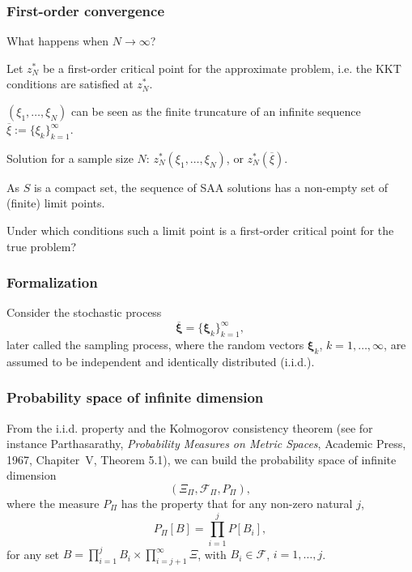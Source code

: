 \documentclass{beamer}
\def\bxi{\boldsymbol\xi}
\begin{document}
\begin{frame}
\frametitle{First-order convergence}

What happens when $N \rightarrow \infty$?

\mbox{}

Let {\red $z_N^*$ be a first-order critical point} for the approximate problem, i.e. the KKT conditions are satisfied at $z_N^*$.

\mbox{}

$(\xi_1,\ldots,\xi_N)$ can be seen as the finite truncature of an infinite sequence $\overline{\xi} := \lbrace \xi_k \rbrace_{k =   1}^{\infty}$.

\mbox{}

Solution for a sample size $N$: $z_N^*(\xi_1,\ldots,\xi_N)$, or $z_N^*\left(\overline{\xi}\right)$.

\mbox{}

As $S$ is a compact set, the sequence of SAA solutions has a non-empty set of (finite) limit points.

\mbox{}

{\blue Under which conditions such a limit point is a first-order critical point for the true problem?}

\end{frame}

\begin{frame}
\frametitle{Formalization}



Consider the stochastic process
\[
\overline{\bxi} = \lbrace \bxi_k \rbrace_{k = 1}^{\infty},
\]
later called the sampling process, where the random vectors $\bxi_k$, $k = 1,\ldots, \infty$, are assumed to be independent and identically distributed (i.i.d.).

\end{frame}

\begin{frame}
\frametitle{Probability space of infinite dimension}

From the i.i.d. property and the Kolmogorov consistency theorem (see for instance Parthasarathy, {\sl Probability Measures on Metric   Spaces}, Academic Press, 1967, Chapiter~V, Theorem 5.1), we can build the probability space of infinite dimension
\[
\left( \Xi_{\Pi}, \mathcal{F}_{\Pi}, P_{\Pi} \right),
\]
where the measure $P_{\Pi}$ has the property that for any non-zero natural $j$,
\[
P_{\Pi}[B] = \prod_{i = 1}^j P[B_i],
\]
for any set $B = \prod_{i=1}^j B_i \times \prod_{i=j+1}^{\infty} \Xi$, with $B_i \in \mathcal{F}$, $i =
1,\ldots,j$.

\end{frame}
\end{document}
